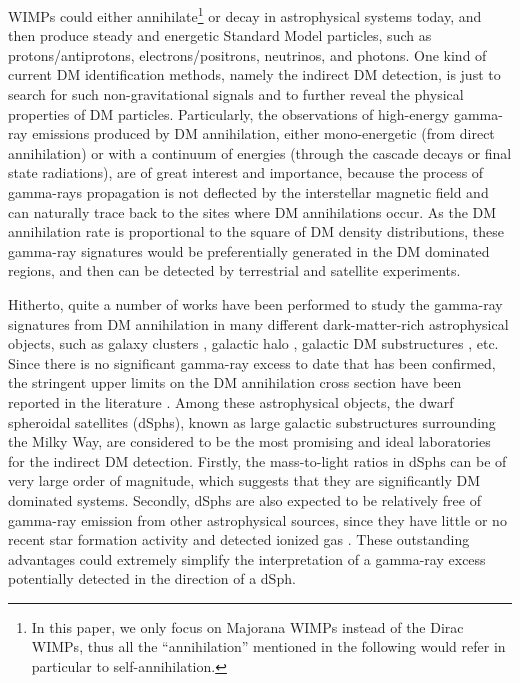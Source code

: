 \documentclass[12pt,aps,prd,amsmath,amssymb,showpacs,floats,floatfix,nofootinbib]{revtex4-1}
\begin{document}
WIMPs could either annihilate\footnote{In this paper, we only focus on Majorana WIMPs instead of the Dirac WIMPs, thus all the ``annihilation'' mentioned in the following would refer in particular to self-annihilation.} or decay in astrophysical systems today, and then produce steady and energetic Standard Model particles, such as protons/antiprotons, electrons/positrons, neutrinos, and photons. One kind of current DM identification methods, namely the indirect DM detection, is just to search for such non-gravitational signals
and to further reveal the physical properties of DM particles. Particularly, the observations of high-energy gamma-ray emissions produced by DM annihilation, either mono-energetic (from direct annihilation) or with a continuum of energies (through the cascade decays or final state radiations), are of great interest and importance, because the process of gamma-rays propagation is not deflected by the interstellar magnetic field and can naturally trace back to the sites where DM annihilations occur. As the DM annihilation rate is proportional to the square of DM density distributions, these gamma-ray signatures would be preferentially generated in the DM dominated regions, and then can be detected by terrestrial and satellite experiments.


Hitherto, quite a number of works have been performed to study the gamma-ray signatures from DM annihilation in many different dark-matter-rich astrophysical objects, such as galaxy clusters \cite{Ackermann:2010rg}, galactic halo \cite{Hooper:2011ti,Ackermann:2012rg,Abazajian:2012pn,Abdo:2010nc,Ackermann:2012qk,Weniger:2012tx,Ackermann:2013uma}, galactic DM substructures \cite{Zechlin:2011kk,Ackermann:2012nb,Zechlin:2012by}, etc. Since there is no significant gamma-ray excess to date that has been confirmed, the stringent upper limits on the DM annihilation cross section have been reported in the literature \cite{Abdo:2010ex,Ackermann:2011wa,GeringerSameth:2011iw,Cholis:2012am,GeringerSameth:2012sr,Mazziotta:2012ux,Baushev:2012ke,Huang:2012yf,Ackermann:2013yva,Ackermann:2015zua,Tsai:2012cs}.
Among these astrophysical objects, the dwarf spheroidal satellites (dSphs), known as large galactic substructures surrounding the Milky Way, are considered to be the most promising and ideal laboratories for the indirect DM detection. Firstly, the mass-to-light ratios in dSphs can be of very large order of magnitude, which suggests that they are significantly DM dominated systems. Secondly, dSphs are also expected to be relatively free of gamma-ray emission from other astrophysical sources, since they have little or no recent star formation activity and detected ionized gas \cite{Mateo:1998wg,Grcevich:2009gt}. These outstanding advantages could extremely simplify the interpretation of a gamma-ray excess potentially detected in the direction of a dSph.
\end{document}
